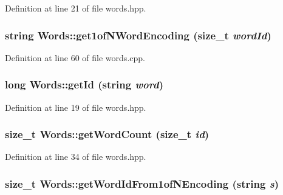 Definition at line 21 of file words.hpp.

\hypertarget{class_words_a11b5b68cd2d4ed55e903a1604b3877e1}{
\subsubsection[{get1ofNWordEncoding}]{\setlength{\rightskip}{0pt plus 5cm}string Words::get1ofNWordEncoding (size\_\-t {\em wordId})}}
\label{class_words_a11b5b68cd2d4ed55e903a1604b3877e1}


Definition at line 60 of file words.cpp.

\hypertarget{class_words_a40260667759acea2b21647f51659580a}{
\subsubsection[{getId}]{\setlength{\rightskip}{0pt plus 5cm}long Words::getId (string {\em word})}}
\label{class_words_a40260667759acea2b21647f51659580a}


Definition at line 19 of file words.hpp.

\hypertarget{class_words_ac6811af00f05b5083e4d1d13f1cd03ce}{
\subsubsection[{getWordCount}]{\setlength{\rightskip}{0pt plus 5cm}size\_\-t Words::getWordCount (size\_\-t {\em id})}}
\label{class_words_ac6811af00f05b5083e4d1d13f1cd03ce}


Definition at line 34 of file words.hpp.

\hypertarget{class_words_aff70348fa0446494c90ba0a89e793297}{
\subsubsection[{getWordIdFrom1ofNEncoding}]{\setlength{\rightskip}{0pt plus 5cm}size\_\-t Words::getWordIdFrom1ofNEncoding (string {\em s})}}
\label{class_words_aff70348fa0446494c90ba0a89e793297}


